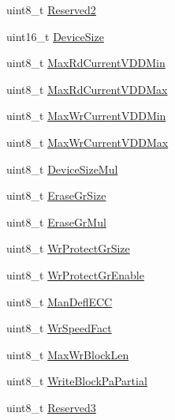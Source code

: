 \begin{DoxyCompactItemize}
\item 
uint8\-\_\-t \hyperlink{group___p_i_o_s___s_d_c_a_r_d_ga2580f84971aaa12e06b546fd8b884dad}{\-Reserved2}
\item 
uint16\-\_\-t \hyperlink{group___p_i_o_s___s_d_c_a_r_d_ga32e9f1203e96670adc0e71599231da0f}{\-Device\-Size}
\item 
uint8\-\_\-t \hyperlink{group___p_i_o_s___s_d_c_a_r_d_ga44848558ce422fd005494fcb94656fa8}{\-Max\-Rd\-Current\-V\-D\-D\-Min}
\item 
uint8\-\_\-t \hyperlink{group___p_i_o_s___s_d_c_a_r_d_ga3ba17f2a67a38414d67aaad8d7cc99be}{\-Max\-Rd\-Current\-V\-D\-D\-Max}
\item 
uint8\-\_\-t \hyperlink{group___p_i_o_s___s_d_c_a_r_d_ga592f9aec07e72eed97e1f28155f23ab4}{\-Max\-Wr\-Current\-V\-D\-D\-Min}
\item 
uint8\-\_\-t \hyperlink{group___p_i_o_s___s_d_c_a_r_d_gab98289ea1b8bc4b5e7fee1820487c07c}{\-Max\-Wr\-Current\-V\-D\-D\-Max}
\item 
uint8\-\_\-t \hyperlink{group___p_i_o_s___s_d_c_a_r_d_gafcf009add5954b88bd7b13630179acd1}{\-Device\-Size\-Mul}
\item 
uint8\-\_\-t \hyperlink{group___p_i_o_s___s_d_c_a_r_d_ga23248a27a48bd1603990d88bc6e6825b}{\-Erase\-Gr\-Size}
\item 
uint8\-\_\-t \hyperlink{group___p_i_o_s___s_d_c_a_r_d_gaaba9c6de9483b08af94542e59c76107e}{\-Erase\-Gr\-Mul}
\item 
uint8\-\_\-t \hyperlink{group___p_i_o_s___s_d_c_a_r_d_ga6976b49fb75de7273c9ae54e5b4df865}{\-Wr\-Protect\-Gr\-Size}
\item 
uint8\-\_\-t \hyperlink{group___p_i_o_s___s_d_c_a_r_d_ga40ddea3e9a913588c57a8f922e929407}{\-Wr\-Protect\-Gr\-Enable}
\item 
uint8\-\_\-t \hyperlink{group___p_i_o_s___s_d_c_a_r_d_ga638d0d0306f38092eba2d405639c2099}{\-Man\-Defl\-E\-C\-C}
\item 
uint8\-\_\-t \hyperlink{group___p_i_o_s___s_d_c_a_r_d_gad518a80289b8949800c8f7e50fc4b21f}{\-Wr\-Speed\-Fact}
\item 
uint8\-\_\-t \hyperlink{group___p_i_o_s___s_d_c_a_r_d_gac00127b98cb9a3a0e1a0bc7960570992}{\-Max\-Wr\-Block\-Len}
\item 
uint8\-\_\-t \hyperlink{group___p_i_o_s___s_d_c_a_r_d_gaa2d30b075bc701aef9e50397db088180}{\-Write\-Block\-Pa\-Partial}
\item 
uint8\-\_\-t \hyperlink{group___p_i_o_s___s_d_c_a_r_d_ga2912ee762425a05b026c2c66039b859b}{\-Reserved3}
\item 

\end{DoxyCompactItemize}

